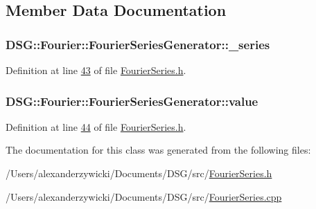 \subsection{Member Data Documentation}
\hypertarget{class_d_s_g_1_1_fourier_1_1_fourier_series_generator_ac66c0907c6daa57f0e33f6b82cc7131d}{
\subsubsection[{\+\_\+series}]{ D\+S\+G\+::\+Fourier\+::\+Fourier\+Series\+Generator\+::\+\_\+series\hspace{0.3cm}{\ttfamily [protected]}}}\label{class_d_s_g_1_1_fourier_1_1_fourier_series_generator_ac66c0907c6daa57f0e33f6b82cc7131d}


Definition at line \hyperlink{_fourier_series_8h_source_l00043}{43} of file \hyperlink{_fourier_series_8h_source}{Fourier\+Series.\+h}.

\hypertarget{class_d_s_g_1_1_fourier_1_1_fourier_series_generator_a1785e78e21decfc65f650a5e3a435ed8}{
\subsubsection[{value}]{ D\+S\+G\+::\+Fourier\+::\+Fourier\+Series\+Generator\+::value\hspace{0.3cm}{\ttfamily [protected]}}}\label{class_d_s_g_1_1_fourier_1_1_fourier_series_generator_a1785e78e21decfc65f650a5e3a435ed8}


Definition at line \hyperlink{_fourier_series_8h_source_l00044}{44} of file \hyperlink{_fourier_series_8h_source}{Fourier\+Series.\+h}.



The documentation for this class was generated from the following files\+:\begin{DoxyCompactItemize}
\item 
/\+Users/alexanderzywicki/\+Documents/\+D\+S\+G/src/\hyperlink{_fourier_series_8h}{Fourier\+Series.\+h}\item 
/\+Users/alexanderzywicki/\+Documents/\+D\+S\+G/src/\hyperlink{_fourier_series_8cpp}{Fourier\+Series.\+cpp}\end{DoxyCompactItemize}
